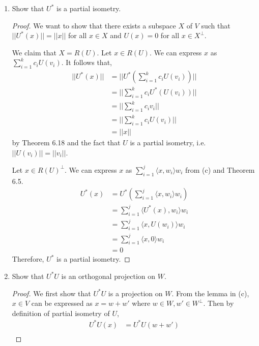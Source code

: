 \documentclass[11pt]{scrartcl}
\begin{document}
\begin{enumerate}[label=\alph*.]
{\begin{proof}
	      \end{proof}
	      }
	\item{
	      Show that $U^{*}$ is a partial isometry.
	      \begin{proof}
		      We want to show that there exists a subspace $X$ of $V$ such that
		      $||U^*(x)|| = ||x||$ for all $x \in X$ and $U(x) = 0$ for all $x \in X^\perp$.\par
		      We claim that $X = R(U)$. Let $x \in R(U)$. We can express $x$ as $\sum_{i = 1}^{k}c_i U(v_i)$. It follows that,
		      \begin{align*}
			      ||U^*(x)|| & = ||U^*(\sum_{i = 1}^{k}c_i U(v_i))|| \\
			                 & = ||\sum_{i = 1}^{k}c_i U^*(U(v_i))|| \\
			                 & = ||\sum_{i = 1}^{k}c_i v_i||         \\
			                 & = ||\sum_{i = 1}^{k}c_i U(v_i)||      \\
			                 & = || x ||
		      \end{align*}
		      by Theorem 6.18 and the fact that $U$ is a partial isometry, i.e. $||U(v_i)|| = ||v_i||$.\par
		      Let $x \in R(U)^\perp$. We can express $x$ as $\sum_{i = 1}^{j} \langle x, w_i \rangle w_i$ from (c) and Theorem 6.5.
		      \begin{align*}
			      U^*(x) & = U^*(\sum_{i = 1}^{j}\langle x, w_i \rangle w_i) \\
			             & = \sum_{i = 1}^{j}\langle U^*(x), w_i \rangle w_i \\
			             & = \sum_{i = 1}^{j}\langle x, U(w_i) \rangle w_i   \\
			             & = \sum_{i = 1}^{j}\langle x, 0 \rangle w_i        \\
			             & = 0
		      \end{align*}
		      Therefore, $U^{*}$ is a partial isometry.
	      \end{proof}
	      }
	\item{
	      Show that $U^{*}U$ is an orthogonal projection on $W$.
	      \begin{proof}
		      We first show that $U^{*}U$ is a projection on $W$. From the lemma in (c), $x \in V$ can be expressed as
		      $x = w + w'$ where $w \in W, w' \in W^\perp$. Then by definition of partial isometry of $U$,
		      \begin{align*}
			      U^{*}U(x) & = U^{*}U(w + w')         \\

\end{align*}
\end{proof}}
\end{enumerate}
\end{document}
